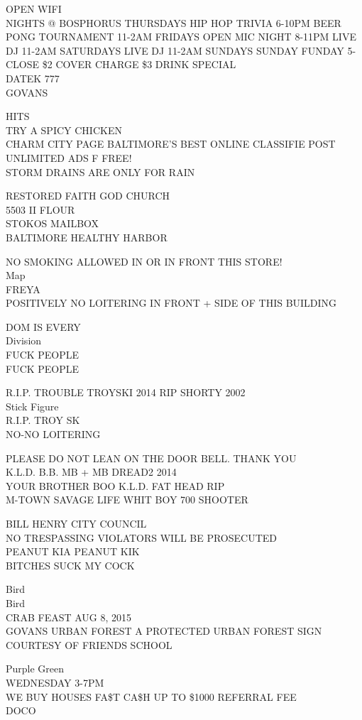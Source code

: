 \documentclass[10pt,letterpaper]{article}
\begin{document}
OPEN WIFI\\
NIGHTS @ BOSPHORUS THURSDAYS HIP HOP TRIVIA 6{-}10PM BEER PONG TOURNAMENT 11{-}2AM FRIDAYS OPEN MIC NIGHT 8{-}11PM LIVE DJ 11{-}2AM SATURDAYS LIVE DJ 11{-}2AM SUNDAYS SUNDAY FUNDAY 5{-}CLOSE \$2 COVER CHARGE \$3 DRINK SPECIAL\\
DATEK 777\\
GOVANS

HITS\\
TRY A SPICY CHICKEN\\
CHARM CITY PAGE BALTIMORE'S BEST ONLINE CLASSIFIE POST UNLIMITED ADS F FREE!\\
STORM DRAINS ARE ONLY FOR RAIN

RESTORED FAITH GOD CHURCH\\
5503 II FLOUR\\
STOKOS MAILBOX\\
BALTIMORE HEALTHY HARBOR

NO SMOKING ALLOWED IN OR IN FRONT THIS STORE!\\
Map\\
FREYA\\
POSITIVELY NO LOITERING IN FRONT + SIDE OF THIS BUILDING

DOM IS EVERY\\
Division\\
FUCK PEOPLE\\
FUCK PEOPLE

R.I.P. TROUBLE TROYSKI 2014 RIP SHORTY 2002\\
Stick Figure\\
R.I.P. TROY SK\\
NO{-}NO LOITERING

PLEASE DO NOT LEAN ON THE DOOR BELL.  THANK YOU\\
K.L.D. B.B. MB + MB DREAD2 2014\\
YOUR BROTHER BOO K.L.D. FAT HEAD RIP\\
M{-}TOWN SAVAGE LIFE WHIT BOY 700 SHOOTER

BILL HENRY CITY COUNCIL\\
NO TRESPASSING VIOLATORS WILL BE PROSECUTED\\
PEANUT KIA PEANUT KIK\\
BITCHES SUCK MY COCK

Bird\\
Bird\\
CRAB FEAST AUG 8, 2015\\
GOVANS URBAN FOREST A PROTECTED URBAN FOREST SIGN COURTESY OF FRIENDS SCHOOL

Purple Green\\
WEDNESDAY 3{-}7PM\\
WE BUY HOUSES FA\$T CA\$H UP TO \$1000 REFERRAL FEE\\
DOCO
\end{document}
